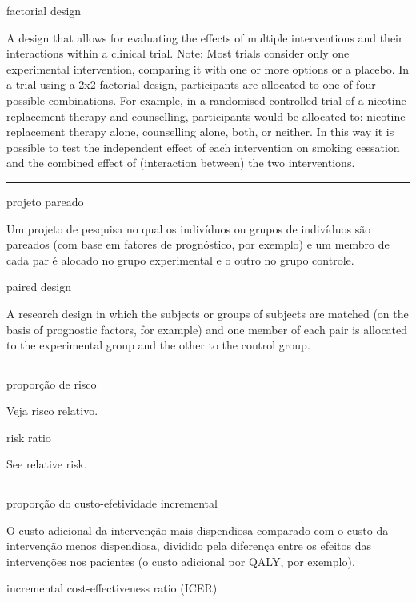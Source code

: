 \documentclass[
]{book}
\begin{document}
factorial design

A design that allows for evaluating the effects of multiple interventions and their interactions within a clinical trial. Note: Most trials consider only one experimental intervention, comparing it with one or more options or a placebo. In a trial using a 2x2 factorial design, participants are allocated to one of four possible combinations. For example, in a randomised controlled trial of a nicotine replacement therapy and counselling, participants would be allocated to: nicotine replacement therapy alone, counselling alone, both, or neither. In this way it is possible to test the independent effect of each intervention on smoking cessation and the combined effect of (interaction between) the two interventions.

\begin{center}\rule{0.5\linewidth}{0.5pt}\end{center}

projeto pareado

Um projeto de pesquisa no qual os indivíduos ou grupos de indivíduos são pareados (com base em fatores de prognóstico, por exemplo) e um membro de cada par é alocado no grupo experimental e o outro no grupo controle.

paired design

A research design in which the subjects or groups of subjects are matched (on the basis of prognostic factors, for example) and one member of each pair is allocated to the experimental group and the other to the control group.

\begin{center}\rule{0.5\linewidth}{0.5pt}\end{center}

proporção de risco

Veja risco relativo.

risk ratio

See relative risk.

\begin{center}\rule{0.5\linewidth}{0.5pt}\end{center}

proporção do custo-efetividade incremental

O custo adicional da intervenção mais dispendiosa comparado com o custo da intervenção menos dispendiosa, dividido pela diferença entre os efeitos das intervenções nos pacientes (o custo adicional por QALY, por exemplo).

incremental cost-effectiveness ratio (ICER)
\end{document}
